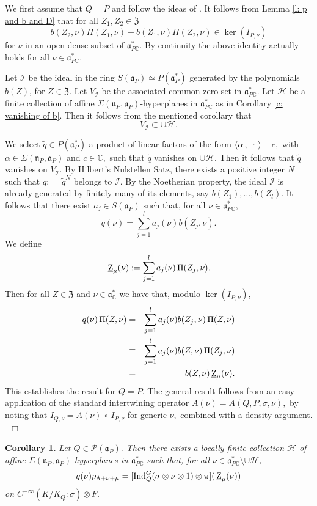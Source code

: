 \documentclass[12pt,a4paper]{article}
\newtheorem{Cor}[Thm]{Corollary}
\newenvironment{cor}[0]{\begin{Cor}\noindent}%
{\end{Cor}}
\def\proof{\par\noindent{\it Proof.}{\ }{\ }}
\def\qed{~\hfill\hbox{$\Box$}\medbreak}
\def\msy#1{{\mathbb #1}}
\def\C{{\msy C}}
\def\ga{\alpha}
\def\gs{\sigma}
\def\gS{\Sigma}
\def\got#1{\mathfrak #1}
\def\fa{{\got a}}
\def\fn{{\got n}}
\def\inp#1#2{\langle#1\,,\,#2\rangle}
\def\after{\,{\scriptstyle\circ}\,}
\def\iC{{\scriptscriptstyle \C}}
\def\cH{{\mathcal H}}
\def\cI{{\mathcal I}}
\def\cP{{\mathcal P}}
\numberwithin{Thm}{section}
\numberwithin{equation}{section}
\def\Ind{{\rm Ind}}
\def\dotvar{\, \cdot\,}
\def\fZ{{\mathfrak Z}}
\def\fadc{\fa_\C^*}
\def\faPdc{{\fa_{P\iC}^*}}
\def\faPd{{\fa_P^*}}
\def\gL{\Lambda}
\numberwithin{equation}{section}
\def\fZ{{\mathfrak Z}}
\def\gL{\Lambda}
\def\faPdc{\fa_{P\iC}^*}
\def\faP{\fa_P}
\def\ulrmZ{\,\underline{\rm Z}_\mu}
\def\bfhyp{hyperplanes}
\begin{document}
\proof
We first assume that $Q = P$ and follow the ideas of \cite[proof of Prop. 8.3]{Bps2}. 
It follows from Lemma \ref{l: p and b and D} that for all $Z_1, Z_2 \in \fZ$ 
$$ 
b(Z_2, \nu) \Pi(Z_1, \nu) - b(Z_1, \nu) \Pi(Z_2, \nu) \in \ker(I_{P, \nu})
$$%
for $\nu$ in an open dense subset of $\faPdc.$ By continuity the above identity 
actually holds for all $\nu \in \faPdc.$ 

Let $\cI$ be the ideal in the ring $S(\fa_P)\simeq P(\fa_P^*)$ generated by the polynomials $b(Z)$, for $Z \in \fZ.$ Let $V_\cI$ be the associated common zero set in $\faPdc.$ 
Let $\cH$ be a finite collection of affine $\gS(\fn_P, \fa_P)$-{\bfhyp} in $\faPdc$ 
as in Corollary \ref{c: vanishing of b}. Then it follows from the mentioned corollary that
$$ 
V_\cI \subset \cup \cH.
$$ 



We select $\tilde q \in P(\faPd)$ a product of linear factors of the form 
$\inp{\ga}{\dotvar} - c,$ with $\ga \in \gS(\fn_P, \faP)$ and $c \in \C,$ 
such that $\tilde q$ vanishes on $\cup \cH.$ 
Then it follows that $\tilde q$ vanishes on $V_\cI.$ By Hilbert's Nulstellen Satz,  
there exists a positive integer $N$ such that $q: = \tilde q^N$ belongs to $\cI.$ By the Noetherian
property, the ideal $\cI$ is already generated by finitely many of its elements,
say $b(Z_1), \ldots , b(Z_l).$ It follows that there exist $a_j \in S(\fa_P)$ such that,
for all $\nu \in \faPdc,$  
$$ 
q(\nu) = \sum_{j=1}^l a_j(\nu) b(Z_j , \nu). 
$$ 
We define
$$ 
\ulrmZ(\nu) := \sum_{j=1}^l a_j(\nu)\, \Pi(Z_j , \nu).
$$ 
Then for all $Z \in \fZ$ and $\nu \in \fadc$ we have that, modulo $\ker (I_{P,\nu})$, 
\begin{eqnarray*}
q(\nu)\,\Pi(Z, \nu) & = & \sum_{j=1}^l a_j(\nu) b(Z_j , \nu)\, \Pi(Z,\nu)\\
& \equiv & \sum_{j=1}^l a_j(\nu) b(Z , \nu) \,\Pi(Z_j,\nu)\\
& =  & b(Z,\nu) \ulrmZ(\nu).
\end{eqnarray*}
This establishes the result for $Q= P.$ The general result follows from an easy application
of the standard intertwining operator $A(\nu) = A(Q,P,\gs,\nu),$ by noting that 
$I_{Q,\nu} = A(\nu) \after I_{P, \nu}$ for generic $\nu,$ combined with a density argument.
\qed

\begin{cor}
\label{c: q p is Z nu}
Let $Q \in \cP(\fa_P).$ Then there exists a locally finite collection $\cH$ 
 of affine $\gS(\fn_P, \fa_P)$-{\bfhyp} in $\faPdc$ such that, for all $\nu \in \faPdc\setminus \cup \cH$,
 $$ 
q(\nu) p_{\gL + \nu + \mu} = [\Ind_Q^G(\gs \otimes \nu \otimes 1) \otimes \pi](\ulrmZ(\nu)) 
$$ 
on $C^{-\infty}(K/K_Q: \gs) \otimes F$. 
\end{cor}
\end{document}
